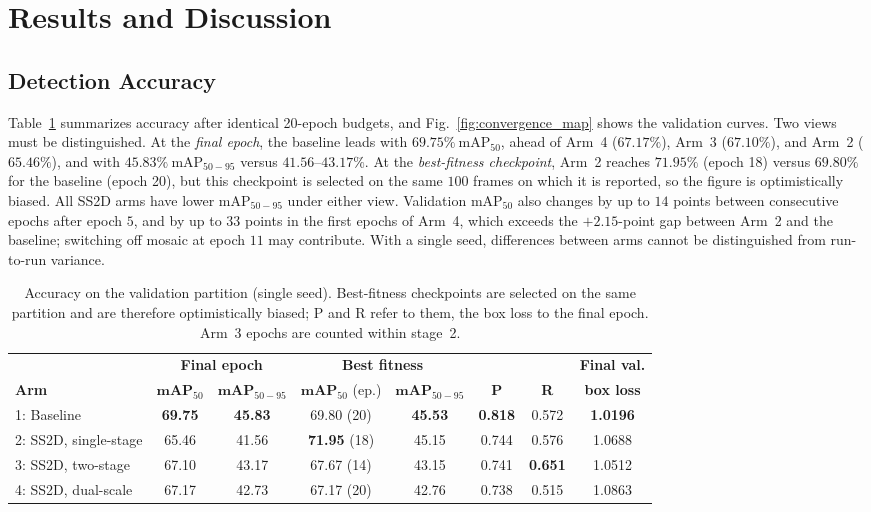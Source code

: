 \section{Results and Discussion}
\label{sec:results}

\subsection{Detection Accuracy}
\label{sec:res_detection}
Table~\ref{tab:accuracy_results} summarizes accuracy after identical 20-epoch budgets, and Fig.~\ref{fig:convergence_map} shows the validation curves. Two views must be distinguished. At the \emph{final epoch}, the baseline leads with $69.75\%\ \text{mAP}_{50}$, ahead of Arm~4 ($67.17\%$), Arm~3 ($67.10\%$), and Arm~2 ($65.46\%$), and with $45.83\%\ \text{mAP}_{50-95}$ versus $41.56$--$43.17\%$. At the \emph{best-fitness checkpoint}, Arm~2 reaches $71.95\%$ (epoch 18) versus $69.80\%$ for the baseline (epoch 20), but this checkpoint is selected on the same $100$ frames on which it is reported, so the figure is optimistically biased. All SS2D arms have lower $\text{mAP}_{50-95}$ under either view. Validation $\text{mAP}_{50}$ also changes by up to $14$ points between consecutive epochs after epoch $5$, and by up to $33$ points in the first epochs of Arm~4, which exceeds the $+2.15$-point gap between Arm~2 and the baseline; switching off mosaic at epoch $11$ may contribute. With a single seed, differences between arms cannot be distinguished from run-to-run variance.

\begin{table}[!t]
\caption{Accuracy on the validation partition (single seed). Best-fitness checkpoints are selected on the same partition and are therefore optimistically biased; P and R refer to them, the box loss to the final epoch. Arm~3 epochs are counted within stage~2.}
\label{tab:accuracy_results}
\centering
\footnotesize
\setlength{\tabcolsep}{2.6pt}
\begin{tabular}{lccccccc}
\toprule
 & \multicolumn{2}{c}{\textbf{Final epoch}} & \multicolumn{2}{c}{\textbf{Best fitness}} & & & \textbf{Final val.} \\
\cmidrule(lr){2-3} \cmidrule(lr){4-5}
\textbf{Arm} & $\textbf{mAP}_{50}$ & $\textbf{mAP}_{50-95}$ & $\textbf{mAP}_{50}$ (ep.) & $\textbf{mAP}_{50-95}$ & \textbf{P} & \textbf{R} & \textbf{box loss} \\
\midrule
1: Baseline & \textbf{69.75} & \textbf{45.83} & 69.80 (20) & \textbf{45.53} & \textbf{0.818} & 0.572 & \textbf{1.0196} \\
2: SS2D, single-stage & 65.46 & 41.56 & \textbf{71.95} (18) & 45.15 & 0.744 & 0.576 & 1.0688 \\
3: SS2D, two-stage & 67.10 & 43.17 & 67.67 (14) & 43.15 & 0.741 & \textbf{0.651} & 1.0512 \\
4: SS2D, dual-scale & 67.17 & 42.73 & 67.17 (20) & 42.76 & 0.738 & 0.515 & 1.0863 \\
\bottomrule
\end{tabular}
\end{table}

